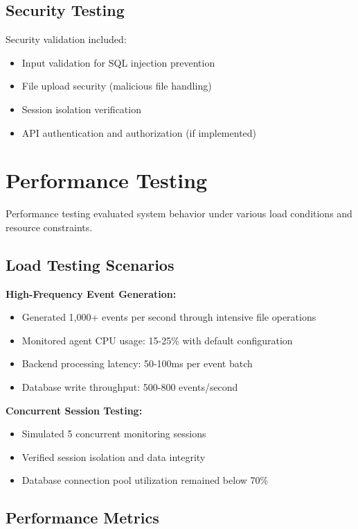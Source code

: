 \subsection{Security Testing}

Security validation included:

\begin{itemize}
    \item Input validation for SQL injection prevention
    \item File upload security (malicious file handling)
    \item Session isolation verification
    \item API authentication and authorization (if implemented)
\end{itemize}

\section{Performance Testing}

Performance testing evaluated system behavior under various load conditions and resource constraints.

\subsection{Load Testing Scenarios}

\textbf{High-Frequency Event Generation:}
\begin{itemize}
    \item Generated 1,000+ events per second through intensive file operations
    \item Monitored agent CPU usage: 15-25\% with default configuration
    \item Backend processing latency: 50-100ms per event batch
    \item Database write throughput: 500-800 events/second
\end{itemize}

\textbf{Concurrent Session Testing:}
\begin{itemize}
    \item Simulated 5 concurrent monitoring sessions
    \item Verified session isolation and data integrity
    \item Database connection pool utilization remained below 70\%
\end{itemize}

\subsection{Performance Metrics}

